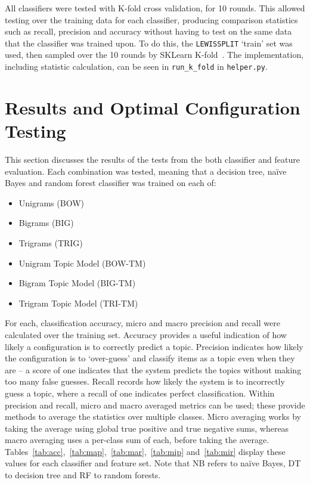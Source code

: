 \documentclass[11pt]{article}
\begin{document}
All classifiers were tested with K-fold cross validation, for 10 rounds. This allowed testing over the training data for each classifier, producing comparison statistics such as recall, precision and accuracy without having to test on the same data that the classifier was trained upon. To do this, the \texttt{LEWISSPLIT} `train' set was used, then sampled over the 10 rounds by SKLearn K-fold~\cite{kf}. The implementation, including statistic calculation, can be seen in \texttt{run\_k\_fold} in \texttt{helper.py}.

\section{Results and Optimal Configuration Testing}
This section discusses the results of the tests from the both classifier and feature evaluation. Each combination was tested, meaning that a decision tree, naïve Bayes and random forest classifier was trained on each of:
\begin{itemize}
\item Unigrams (BOW)
\item Bigrams (BIG)
\item Trigrams (TRIG)
\item Unigram Topic Model (BOW-TM)
\item Bigram Topic Model (BIG-TM)
\item Trigram Topic Model (TRI-TM)
\end{itemize}

For each, classification accuracy, micro and macro precision and recall were calculated over the training set. Accuracy provides a useful indication of how likely a configuration is to correctly predict a topic. Precision indicates how likely the configuration is to `over-guess' and classify items as a topic even when they are – a score of one indicates that the system predicts the topics without making too many false guesses. Recall records how likely the system is to incorrectly guess a topic, where a recall of one indicates perfect classification. Within precision and recall, micro and macro averaged metrics can be used; these provide methods to average the statistics over multiple classes. Micro averaging works by taking the average using global true positive and true negative sums, whereas macro averaging uses a per-class sum of each, before taking the average. Tables~\ref{tab:acc},~\ref{tab:map},~\ref{tab:mar},~\ref{tab:mip} and~\ref{tab:mir} display these values for each classifier and feature set. Note that NB refers to na{\"i}ve Bayes, DT to decision tree and RF to random forests.
\end{document}
